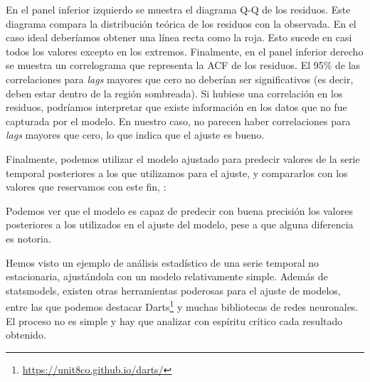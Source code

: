 En el panel inferior izquierdo se muestra el diagrama Q-Q de los residuos. Este diagrama compara la distribución teórica de los residuos con la observada. En el caso ideal deberíamos obtener una línea recta como la roja. Esto sucede en casi todos los valores excepto en los extremos. Finalmente, en el panel inferior derecho se muestra un correlograma que representa la ACF de los residuos. El 95\% de las correlaciones para \textit{lags} mayores que cero no deberían ser significativos (es decir, deben estar dentro de la región sombreada). Si hubiese una correlación en los residuos, podríamos interpretar que existe información en los datos que no fue capturada por el modelo. En nuestro caso, no parecen haber correlaciones para \textit{lags} mayores que cero, lo que indica que el ajuste es bueno.

Finalmente, podemos utilizar el modelo ajustado para predecir valores de la serie temporal posteriores a los que utilizamos para el ajuste, y compararlos con los valores que reservamos con este fin, :

Podemos ver que el modelo es capaz de predecir con buena precisión los valores posteriores a los utilizados en el ajuste del modelo, pese a que alguna diferencia es notoria. 

Hemos visto un ejemplo de análisis estadístico de una serie temporal no estacionaria, ajustándola con un modelo relativamente simple. Además de statsmodels, existen otras herramientas poderosas para el ajuste de modelos, entre las que podemos destacar Darts\footnote{\url{https://unit8co.github.io/darts/}} y muchas bibliotecas de redes neuronales. El proceso no es simple y hay que analizar con espíritu crítico cada resultado obtenido.


